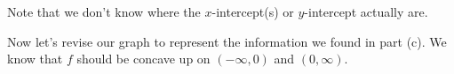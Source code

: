 \documentclass{article}
\begin{document}
\begin{enumerate}
\begin{enumerate}[resume]
\begin{solution}
     Note that we don't know where the $x$-intercept(s) or $y$-intercept actually are.

     Now let's revise our graph to represent the information we found in part (c). We know that $f$ should
     be concave up on $(-\infty, 0)$ and $(0, \infty)$. 
     \begin{center}
      \end{center}
      
    \end{solution}

    

  \end{enumerate}

\end{enumerate}
\end{document}
